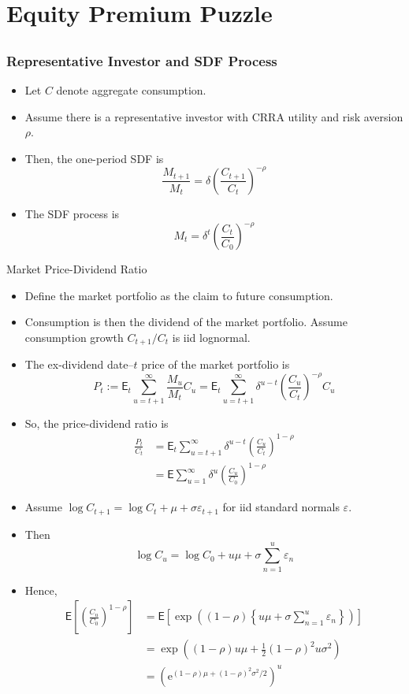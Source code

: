\documentclass[10pt]{beamer}
\newcommand{\bi}{\begin{itemize}}
\newcommand{\ei}{\end{itemize}}
\newcommand{\im}{\item}
\newcommand{\E}{\mathrm{e}}
\newcommand{\mye}{\ensuremath{\mathsf{E}}}
\newcommand{\bfr}{\begin{frame}}
\begin{document}
\section{Equity Premium Puzzle}
\subsection{}

\bfr\frametitle{Representative Investor and SDF Process}
\bi \im 
Let $C$ denote aggregate consumption.    \im Assume there is a representative investor with CRRA utility and risk aversion $\rho$.  \im Then, the one-period SDF is
$$\frac{M_{t+1}}{M_t} = \delta \left(\frac{C_{t+1}}{C_t}\right)^{-\rho}$$

\im The SDF process is
$$M_t = \delta^t \left(\frac{C_{t}}{C_0}\right)^{-\rho}$$
\ei 
\end{frame}

\begin{frame}{Market Price-Dividend Ratio}
\bi 
\im Define the market portfolio as the claim to future consumption.  
\im Consumption is then the dividend of the market portfolio.  Assume consumption growth $C_{t+1}/C_t$ is iid lognormal.
\im 
The ex-dividend date--$t$ price of the market portfolio is
$$
   P_t := \mye_t \sum_{u=t+1}^\infty \frac{M_u}{M_t}C_u  = \mye_t \sum_{u=t+1}^\infty \delta^{u-t}\left(\frac{C_u}{C_t}\right)^{-\rho}C_u$$
\im So, the price-dividend ratio is
\begin{align*}
    \frac{P_t}{C_t} & = \mye_t \sum_{u=t+1}^\infty \delta^{u-t}\left(\frac{C_u}{C_t}\right)^{1-\rho}\\
    & = \mye \sum_{u=1}^\infty \delta^{u}\left(\frac{C_u}{C_0}\right)^{1-\rho}
\end{align*}
\ei 
\end{frame}

\begin{frame}[plain]
\bi 
\im Assume $\log C_{t+1} = \log C_t + \mu + \sigma \varepsilon_{t+1}$ for iid standard normals $\varepsilon$.  

\im Then 
$$\log C_u = \log C_0 + u\mu + \sigma \sum_{n=1}^u \varepsilon_n$$
\im Hence,
\begin{align*}
    \mye \left[\left(\frac{C_u}{C_0}\right)^{1-\rho}\right] &= \mye \left[\exp \left((1-\rho)\left\{u\mu + \sigma \sum_{n=1}^u \varepsilon_n\right\}\right)\right]\\
 &=\exp \left((1-\rho)u\mu + \frac{1}{2}(1-\rho)^2u\sigma^2 \right) \\
 &= \left(\E^{(1-\rho)\mu + (1-\rho)^2\sigma^2/2} \right)^u 
\end{align*}
\ei 
\end{frame}
\end{document}
